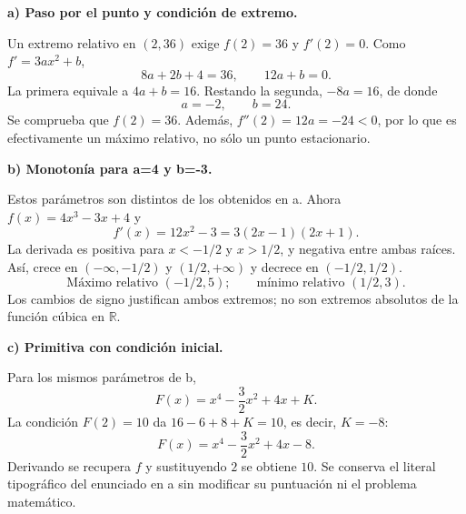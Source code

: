 \textbf{a) Paso por el punto y condición de extremo.}\par\nopagebreak[4]
Un extremo relativo en $(2,36)$ exige $f(2)=36$ y $f'(2)=0$. Como $f'=3ax^2+b$,
\[
8a+2b+4=36,\qquad12a+b=0.
\]
La primera equivale a $4a+b=16$. Restando la segunda, $-8a=16$, de donde
\[
\boxed{a=-2,\qquad b=24.}
\]
Se comprueba que $f(2)=36$. Además, $f''(2)=12a=-24<0$, por lo que es efectivamente un máximo relativo, no sólo un punto estacionario.

\textbf{b) Monotonía para a=4 y b=-3.}\par\nopagebreak[4]
Estos parámetros son distintos de los obtenidos en a. Ahora $f(x)=4x^3-3x+4$ y
\[
f'(x)=12x^2-3=3(2x-1)(2x+1).
\]
La derivada es positiva para $x<-1/2$ y $x>1/2$, y negativa entre ambas raíces. Así, crece en $(-\infty,-1/2)$ y $(1/2,+\infty)$ y decrece en $(-1/2,1/2)$.
\[
\boxed{\text{Máximo relativo }(-1/2,5);\qquad\text{mínimo relativo }(1/2,3).}
\]
Los cambios de signo justifican ambos extremos; no son extremos absolutos de la función cúbica en $\mathbb R$.

\textbf{c) Primitiva con condición inicial.}\par\nopagebreak[4]
Para los mismos parámetros de b,
\[
F(x)=x^4-\frac32x^2+4x+K.
\]
La condición $F(2)=10$ da $16-6+8+K=10$, es decir, $K=-8$:
\[
\boxed{F(x)=x^4-\frac32x^2+4x-8.}
\]
Derivando se recupera $f$ y sustituyendo $2$ se obtiene $10$. Se conserva el literal tipográfico del enunciado en a sin modificar su puntuación ni el problema matemático.

